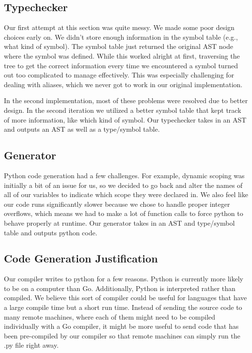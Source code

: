 \documentclass{article}
\begin{document}
\subsection{Typechecker}

Our first attempt at this section was quite messy. We made some poor design choices early on. We didn't store enough information in the symbol table (e.g., what kind of symbol). The symbol table just returned the original AST node where the symbol was defined. While this worked alright at first, traversing the tree to get the correct information every time we encountered a symbol turned out too complicated to manage effectively. This was especially challenging for dealing with aliases, which we never got to work in our original implementation.

In the second implementation, most of these problems were resolved due to better design. In the second iteration we utilized a better symbol table that kept track of more information, like which kind of symbol. Our typechecker takes in an AST and outputs an AST as well as a type/symbol table.

\subsection{Generator}

Python code generation had a few challenges. For example, dynamic scoping was initially a bit of an issue for us, so we decided to go back and alter the names of all of our variables to indicate which scope they were declared in. We also feel like our code runs significantly slower because we chose to handle proper integer overflows, which means we had to make a lot of function calls to force python to behave properly at runtime. Our generator takes in an AST and type/symbol table and outputs python code.

\subsection{Code Generation Justification}
Our compiler writes to python for a few reasons. Python is currently more likely to be on a computer than Go. Additionally, Python is interpreted rather than compiled. We believe this sort of compiler could be useful for languages that have a large compile time but a short run time. Instead of sending the source code to many remote machines, where each of them might need to be compiled individually with a Go compiler, it might be more useful to send code that has been pre-compiled by our compiler so that remote machines can simply run the .py file right away.
\end{document}
